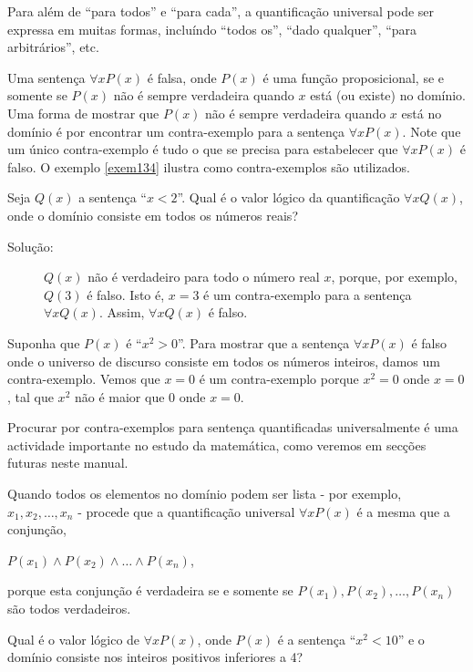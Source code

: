 Para além de ``para todos'' e ``para cada'', a quantificação universal pode ser
expressa em muitas formas, incluíndo ``todos os'', ``dado qualquer'', ``para
arbitrários'', etc.

Uma sentença $\forall xP(x)$ é falsa, onde $P(x)$ é uma função proposicional, se
e somente se $P(x)$ não é sempre verdadeira quando $x$ está (ou existe) no
domínio. Uma forma de mostrar que $P(x)$ não é sempre verdadeira quando $x$ está
no domínio é por encontrar um contra-exemplo para a sentença $\forall xP(x)$.
Note que um único contra-exemplo é tudo o que se precisa para estabelecer que
$\forall xP(x)$ é falso. O exemplo \ref{exem134} ilustra como contra-exemplos
são utilizados.

\begin{exmp}
\label{exem134}
Seja $Q(x)$ a sentença ``$x < 2$''. Qual é o valor lógico da quantificação
$\forall xQ(x)$, onde o domínio consiste em todos os números reais?
\end{exmp}
\begin{description}
\item[Solução:] $Q(x)$ não é verdadeiro para todo o número real $x$, porque, por
exemplo, $Q(3)$ é falso. Isto é, $x=3$ é um contra-exemplo para a sentença
$\forall xQ(x)$. Assim, $\forall xQ(x)$ é falso.
\end{description}

\begin{exmp}
\label{exem135}
Suponha que $P(x)$ é ``$x^2 > 0$''. Para mostrar que a sentença $\forall xP(x)$
é falso onde o universo de discurso consiste em todos os números inteiros, damos
um contra-exemplo. Vemos que $x = 0$ é um contra-exemplo porque $x^2 = 0$ onde
$x = 0$, tal que $x^2$ não é maior que $0$ onde $x=0$.
\end{exmp}

Procurar por contra-exemplos para sentença quantificadas universalmente é uma
actividade importante no estudo da matemática, como veremos em secções futuras
neste manual.

Quando todos os elementos no domínio podem ser lista - por exemplo, $x_1, x_2,
\ldots, x_n$ - procede que a quantificação universal $\forall xP(x)$ é a mesma
que a conjunção,
\begin{center}
$P(x_1) \land P(x_2) \land \ldots \land P(x_n)$,
\end{center}
porque esta conjunção é verdadeira se e somente se $P(x_1),P(x_2),\ldots,P(x_n)$
são todos verdadeiros.

\begin{exmp}
\label{exem136}
Qual é o valor lógico de $\forall xP(x)$, onde $P(x)$ é a sentença ``$x^2 <
10$'' e o domínio consiste nos inteiros positivos inferiores a 4?
\end{exmp}

